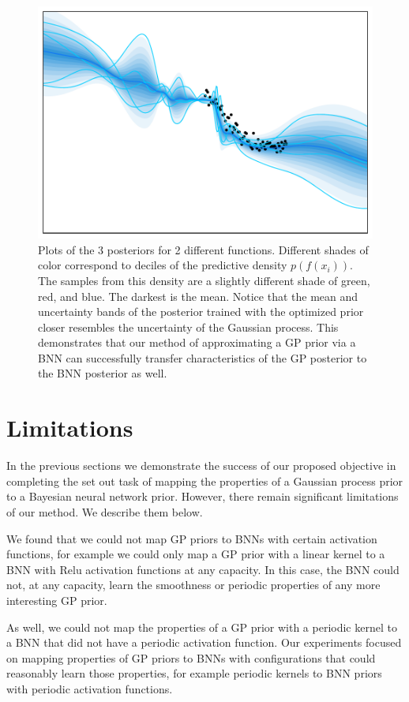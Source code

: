 \documentclass{article}
\begin{document}
\begin{figure}[h]
    \includegraphics[width=.48\textwidth]{figs/expxbnn}       
    \caption{Plots of the 3 posteriors for 2 different functions.
    Different shades of color correspond to deciles of the predictive density 
    $ p(f(x_i)) $. The samples from this density are a slightly different shade 
    of green, red, and blue. The darkest is the mean. 
Notice that the mean and uncertainty bands of the posterior trained with the optimized prior
closer resembles the uncertainty of the Gaussian process. 
This demonstrates that our method of approximating a GP prior via a BNN can successfully 
transfer characteristics of the GP posterior to the BNN posterior as well. }
    \label{fig:my_label}
\end{figure}





\newpage

\section{Limitations}

In the previous sections we demonstrate the success of our proposed objective in completing the set out
task of mapping the properties of a Gaussian process prior to a Bayesian neural network prior.
However, there remain significant limitations of our method. We describe them below.

We found that we could not map GP priors to BNNs with certain activation functions, for example 
we could only map a GP prior with a linear kernel to a BNN with Relu activation functions at any capacity.
In this case, the BNN could not, at any capacity, learn the smoothness or periodic properties of any 
more interesting GP prior. 

As well, we could not map the properties of a GP prior with a periodic kernel to a BNN that did not 
have a periodic activation function. Our experiments focused on mapping properties of GP priors to BNNs 
with configurations that could reasonably learn those properties, for example periodic kernels to BNN priors 
with periodic activation functions.
\end{document}
